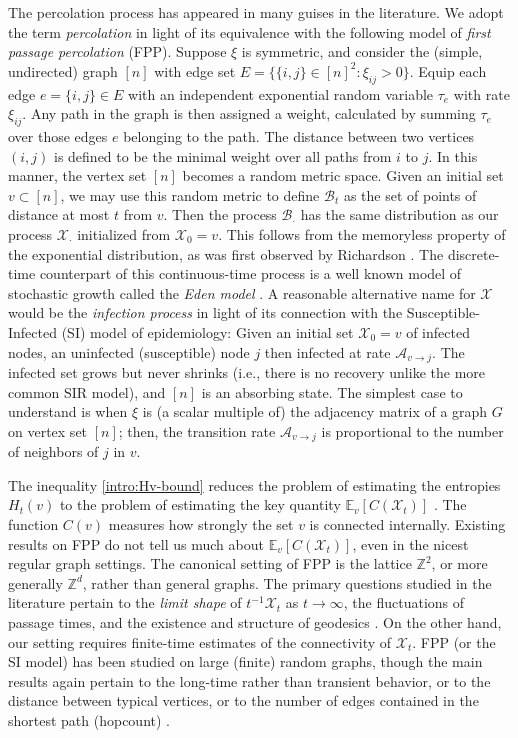 \documentclass[11pt,reqno]{amsart}
\numberwithin{equation}{section}
\theoremstyle{definition}
\def\CC{{C}}
\def\A{{\mathcal A}}
\def\E{{\mathbb E}}
\def\X{{\mathcal X}}
\def\Z{{\mathbb Z}}
\begin{document}
The percolation process has appeared in many guises in the literature. We adopt the term \emph{percolation} in light of its equivalence with the following model of \emph{first passage percolation} (FPP). Suppose $\xi$ is symmetric, and consider the (simple, undirected) graph $[n]$ with edge set $E=\{\{i,j\} \in [n]^2 : \xi_{ij} > 0\}$. Equip each edge $e=\{i,j\} \in E$ with an independent exponential random variable $\tau_e$ with rate $\xi_{ij}$. Any path in the graph is then assigned a weight, calculated by summing $\tau_e$ over those edges $e$ belonging to the path. The distance between two vertices $(i,j)$ is defined to be the minimal weight over all paths from $i$ to $j$. In this manner, the vertex set $[n]$ becomes a random metric space. Given an initial set $v \subset [n]$, we may use this random metric to define $\mathcal{B}_t$ as the set of points of distance at most $t$ from $v$. Then the process $\mathcal{B}_\cdot$ has the same distribution as our process $\X_\cdot$ initialized from $\X_0=v$. This follows from the memoryless property of the exponential distribution, as was first observed by Richardson \cite{richardson1973random}. 
The discrete-time counterpart of this continuous-time process is  a well known model of stochastic growth called the \emph{Eden model} \cite{eden1961two}.
A reasonable alternative name for $\X$ would be the \emph{infection process} in light of its connection with the Susceptible-Infected (SI) model of epidemiology: Given  an initial set $\X_0=v$  of infected nodes, an uninfected (susceptible) node $j$ then infected at rate $\A_{v \to j}$. The infected set grows but never shrinks (i.e., there is no recovery unlike the more common SIR model), and $[n]$ is an  absorbing state. 
The simplest case to understand is when $\xi$ is (a scalar multiple of) the adjacency matrix of a graph $G$ on vertex set $[n]$; then, the transition rate $\A_{v \to j}$ is proportional to the   number of neighbors of $j$ in $v$. 




The inequality \eqref{intro:Hv-bound} reduces the problem of estimating the entropies $H_t(v)$ to the problem of estimating the key quantity  $\E_v[\CC(\X_t)]$ . The function $\CC(v)$ measures how strongly the set $v$ is connected internally. 
Existing results on FPP do not tell us much about  $\E_v[\CC(\X_t)]$, even in the nicest regular graph settings.
The canonical setting of FPP is the lattice $\Z^2$, or more generally $\Z^d$, rather than general graphs. The primary questions studied in the literature pertain to the \emph{limit shape} of $t^{-1}\X_t$ as $t\to\infty$, the fluctuations of passage times, and the existence and structure of geodesics \cite{auffinger201750}. On the other hand, our setting requires finite-time estimates of the connectivity of $\X_t$.
FPP (or the SI model) has been studied on large (finite) random graphs, though the main results again pertain to the long-time rather than transient behavior, or to the distance between typical vertices, or to the number of edges contained in the shortest path (hopcount) \cite{van2001first}.
\end{document}

